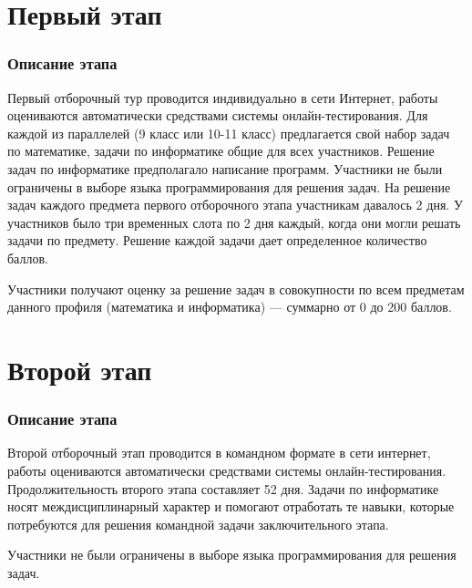 \documentclass[a4paper,12pt,oneside]{book}
\begin{document}

\setcounter{tocdepth}{1}

\tableofcontents



\part{Первый этап}
\newpage
\section*{Описание этапа}

Первый отборочный тур проводится индивидуально в сети Интернет,
работы оцениваются автоматически средствами системы
онлайн-тестирования.
Для каждой из параллелей (9 класс или 10-11
класс)
предлагается свой набор задач по математике, задачи по информатике общие
для всех участников. Решение задач по информатике предполагало
написание программ. Участники не были ограничены в выборе языка программирования для
решения задач. На решение
задач каждого предмета первого отборочного этапа участникам давалось 2
дня. У участников было три временных слота по 2 дня каждый, когда они
могли решать задачи по предмету. Решение каждой задачи дает
определенное количество баллов.

Участники получают оценку за решение задач
в совокупности по всем предметам данного профиля (математика и
информатика) --- суммарно от 0 до 200 баллов.




\part{Второй этап}
\newpage
\section*{Описание этапа}

Второй отборочный этап проводится в командном формате в сети
интернет, работы оцениваются автоматически средствами системы
онлайн-тестирования.
Продолжительность второго этапа составляет 52 дня. Задачи
по информатике носят междисциплинарный характер и помогают отработать те
навыки, которые потребуются для решения командной задачи заключительного этапа.

Участники не были ограничены в выборе языка программирования для решения задач.
\end{document}
